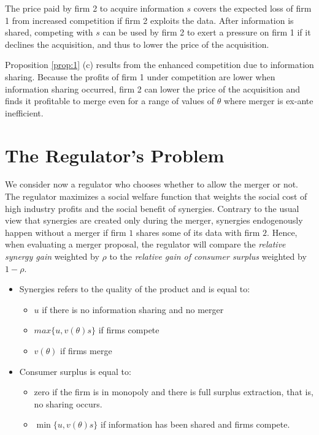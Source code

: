 \documentclass[a4paper,leqno]{article}%
\renewcommand{\t}{\theta}
\renewcommand{\t}{\theta}
\begin{document}
\medskip

The price paid by firm 2 to acquire information $s$ covers the expected loss of firm 1 from increased competition if firm 2 exploits the data. After information is shared, competing with $s$ can be used by firm 2 to exert a pressure on firm 1 if it declines the acquisition, and thus to lower the price of the acquisition. 

\medskip

Proposition \ref{prop:1} (c) results from the enhanced competition due to information sharing. Because the profits of firm 1 under competition are lower when information sharing occurred, firm 2 can lower the price of the acquisition and finds it profitable to merge even for a range of values of $\t$ where merger is ex-ante inefficient.

\medskip

\section{The Regulator's Problem}

We consider now a regulator who chooses whether to allow the merger or not. The regulator maximizes a social welfare function that weights the social cost of high industry profits and the social benefit of synergies. Contrary to the usual view that synergies are created only during the merger, synergies endogenously happen without a merger if firm $1$ shares some of its data with firm $2$. Hence, when evaluating a merger proposal, the regulator will compare the \emph{relative synergy gain} weighted by $\rho$ to the \emph{relative gain of consumer surplus} weighted by $1-\rho$.


\begin{itemize}
    \item Synergies refers to the quality of the product and is equal to:
    \begin{itemize}
        \item $u$ if there is no information sharing and no merger
        \item $max\{u,v(\t)s\}$ if firms compete
        \item $v(\t)$ if firms merge
    \end{itemize}
    \item Consumer surplus is equal to:
    \begin{itemize}
        \item zero if the firm is in monopoly and there is full surplus extraction, that is, no sharing occurs.
        \item $\min\{u,v(\t)s\}$ if information has been shared and firms compete.
    \end{itemize}
\end{itemize}
\end{document}
